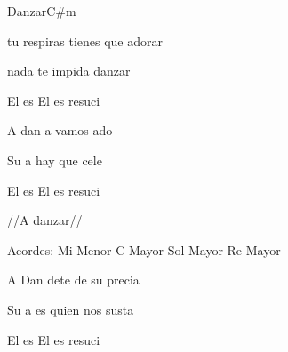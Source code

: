 \documentclass[12pt, spanish]{book}
\begin{document}
\begin{song}{Danzar}{C\#m}
\begin{SBExtraKeys}
{            \begin{SBOpGroup}
                 tu respiras tienes que adorar

                 nada te impida danzar
            \end{SBOpGroup}

            \begin{SBOpGroup}
                El es  El es  resuci

                A dan a  vamos ado

                Su a hay que cele

                El es  El es  resuci

                //A danzar//
            \end{SBOpGroup}

            \ifChordBk
            \begin{SBOpGroup}
                Acordes:
                \upchord{\Em}\qquad Mi Menor \hfill
                \upchord{\C}\qquad C Mayor \hfill\null\break
                \upchord{\G}\qquad Sol Mayor \hfill
                \upchord{\D}\qquad Re Mayor \hfill\null\break
            \end{SBOpGroup}
            \fi

        }\end{SBExtraKeys}

        \begin{SBExtraKeys}{


            \begin{SBChorus}
                A Dan dete de su precia

                Su a es quien nos susta

                El es  El es  resuci
            \end{SBChorus}

}
\end{SBExtraKeys}
\end{song}
\end{document}
